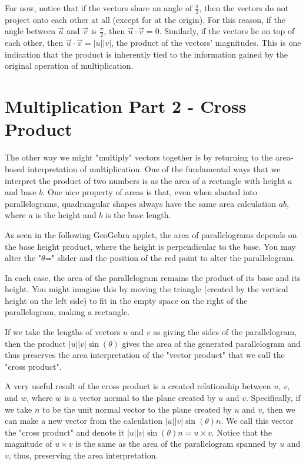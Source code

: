\documentclass{ximera}
\begin{document}
For now, notice that if the vectors share an angle of $\frac{\pi}{2}$, then the vectors do not project onto each other at all (except for at the origin). For this reason, if the angle between $\vec u$ and $\vec v$ is $\frac{\pi}{2}$, then $\vec u\cdot\vec v=0$. Similarly, if the vectors lie on top of each other, then $\vec u\cdot\vec v=|u||v|$, the product of the vectors' magnitudes. This is one indication that the product is inherently tied to the information gained by the original operation of multiplication.

\section{Multiplication Part 2 - Cross Product}

The other way we might "multiply" vectors together is by returning to the area-based interpretation of multiplication. One of the fundamental ways that we interpret the product of two numbers is as the area of a rectangle with height $a$ and base $b$. One nice property of areas is that, even when slanted into parallelograms, quadrangular shapes always have the same area calculation $ab$, where $a$ is the height and $b$ is the base length.

As seen in the following GeoGebra applet, the area of parallelograms depends on the base height product, where the height is perpendicular to the base. You may alter the "$\theta$=" slider and the position of the red point to alter the parallelogram.

\begin{center}
\end{center}

In each case, the area of the parallelogram remains the product of its base and its height. You might imagine this by moving the triangle (created by the vertical height on the left side) to fit in the empty space on the right of the parallelogram, making a rectangle.

If we take the lengths of vectors $u$ and $v$ as giving the sides of the parallelogram, then the product $|u||v|\sin(\theta)$ gives the area of the generated parallelogram and thus preserves the area interpretation of the "vector product" that we call the "cross product".

A very useful result of the cross product is a created relationship between $u$, $v$, and $w$, where $w$ is a vector normal to the plane created by $u$ and $v$. Specifically, if we take $n$ to be the unit normal vector to the plane created by $u$ and $v$, then we can make a new vector from the calculation $|u||v|\sin(\theta)n$. We call this vector the "cross product" and denote it $|u||v|\sin(\theta)n=u\times v$. Notice that the magnitude of $u\times v$ is the same as the area of the parallelogram spanned by $u$ and $v$, thus, preserving the area interpretation.
\end{document}
